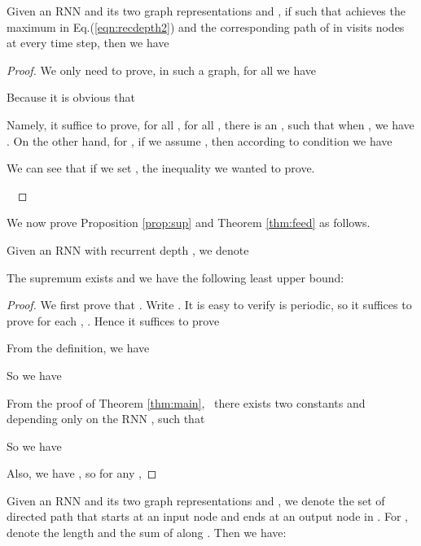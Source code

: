 \begin{proposition}
\label{prop:assump}
  Given an RNN and its two graph representations  and
  , if  such that
    achieves the maximum in Eq.(\ref{eqn:recdepth2}) and 
  the corresponding path of  in  visits nodes at every time step,
  then we have
  
\end{proposition}

\begin{proof}
  We only need to prove, in such a graph, for all  we have
  
  Because it is obvious that
  
  Namely, it suffice to prove, for all , for all , there is an , such that when , we
  have . On the other hand,
  for , if we assume , then according to condition  we
  have
  
  We can see that if we set , the inequality we wanted to prove.
  
  \ 
\end{proof}

We now prove Proposition \ref{prop:sup} and Theorem \ref{thm:feed} as follows.


\begin{proposition}
  Given an RNN with recurrent depth , we denote
  
  The supremum  exists and we have the following least upper bound:
  
\end{proposition}

\begin{proof}
  We first prove that . Write . It is easy to verify
   is periodic, so it suffices to prove for each , . Hence it suffices to prove
  
  From the definition, we have
  
  So we have
  
  From the proof of Theorem \ref{thm:main}, \ there exists two constants  and
   depending only on the RNN , such that
  
  So we have
  
  Also, we have , so for any ,
  
  
\end{proof}

\begin{thm}
  Given an RNN and its two graph representations  and
  , we denote  the set of directed path
  that starts at an input node and ends at an output node in .
  For , denote  the length and
   the sum of  along . Then we have:
  
\end{thm}

